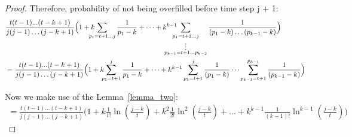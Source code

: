 \begin{proof}
Therefore, probability of not being overfilled before time step j + 1:
\begin{align}
    & \frac{t(t - 1)...(t - k + 1)}{j (j - 1) \dots (j - k + 1)} \Big(1 + k\hspace{-1em}\sum_{p_1 = t + 1\dots j}^{}\frac{1}{p_1 - k} + \dots
    + {k^{k - 1}}\hspace{-2em}\sum_{\substack{p_1 = t + 1 \dots j \\\vdots\\ p_{k-1} = t + 1 \dots p_{k-2}}}\frac{1}{(p_1 - k)\dots (p_{k-1} - k)} \Big)\\
    & = 
    \frac{t(t - 1)...(t - k + 1)}{j (j - 1) \dots (j - k + 1)} \Big(1 + k\hspace{-0.5 em}\sum_{p_1 = t + 1}^{j}\frac{1}{p_1 - k} + 
     \dots  +
     {k^{k - 1}}\sum_{p_1 = t + 1}^{j}\frac{1}{ (p_{1} - k)} \dots \sum_{p_{k-1} = t + 1}^{p_{k-1}}\frac{1}{ (p_{k-1} - k)} \Big) 
\end{align}

Now we make use of the  
Lemma~\ref{lemma_two}:
\begin{align}
 = 
     \frac{t(t - 1)\dots (t - k + 1)}{j(j - 1)\dots(j - k + 1)}(1 + {k}\frac{1}{1!}\ln (\frac{j - k}{t}) + {k^2}\frac{1}{2!}\ln^2(\frac{j - k}{t}) + \dots + {k^{k - 1}}\frac{1}{(k-1)!}\ln^{k - 1}(\frac{j - k}{t})\Big)
\end{align}


\end{proof}
